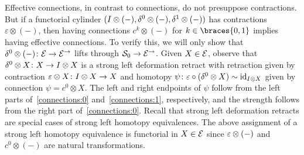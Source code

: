 \documentclass[reqno,10pt,a4paper,oneside,draft]{amsart}
\begin{document}
\begin{remark} \label{connections-are-effective}
Effective connections, in contrast to connections, do not presuppose contractions.
But if a functorial cylinder $(I \otimes (-), \delta^0 \otimes (-), \delta^1 \otimes (-))$ has contractions $\varepsilon \otimes (-)$, then having connections $c^k \otimes (-)$ for $k \in \braces{0, 1}$ implies having effective connections.
To verify this, we will only show that $\delta^0 \otimes (-) \colon \mathcal{E} \to \mathcal{E}^\to$ lifts through $\mathcal{S}_0 \to \mathcal{E}^\to$.
Given $X \in \mathcal{E}$, observe that $\delta^0 \otimes X \colon X \to I \otimes X$ is a strong left deformation retract with retraction given by contraction $\varepsilon \otimes X \colon I \otimes X \to X$ and homotopy $\psi \colon \varepsilon \mathbin{\circ} (\delta^0 \otimes X) \sim \operatorname{id}_{I \otimes X}$ given by connection $\psi = c^0 \otimes X$.
The left and right endpoints of $\psi$ follow from the left parts of~\eqref{connections:0} and~\eqref{connections:1}, respectively, and the strength follows from the right part of~\eqref{connections:0}.
Recall that strong left deformation retracts are special cases of strong left homotopy equivalences.
The above assignment of a strong left homotopy equivalence is functorial in $X \in \mathcal{E}$ since $\varepsilon \otimes (-)$ and $c^0 \otimes (-)$ are natural transformations.
\end{remark}
\end{document}
